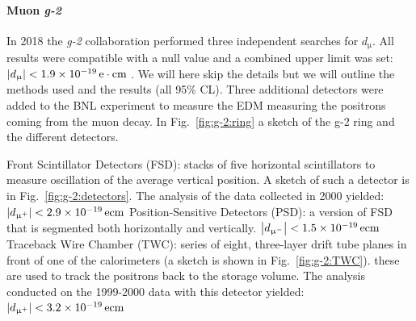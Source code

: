 \begin{refsection}
            \paragraph{Muon \textit{g-2}}
            In 2018 the \textit{g-2} collaboration performed three independent searches for $d_\upmu$.
            All results were compatible with a null value and a combined upper limit was set: $\abs{d_\upmu}<\SI{1.9e-19}{e\cdot cm}$ \cite{muEDM:direct}.  
            We will here skip the details but we will outline the methods used and the results (all 95\% CL).
            Three additional detectors were added to the BNL experiment to measure the EDM measuring the positrons coming from the muon decay.
            In Fig.~\ref{fig:g-2:ring} a sketch of the g-2 ring and the different detectors.
            \begin{outline}
                \1 Front Scintillator Detectors (FSD): stacks of five horizontal scintillators to measure oscillation of the average vertical position. A sketch of such a detector is in Fig.~\ref{fig:g-2:detectors}.
                The analysis of the data collected in 2000 yielded: $\abs{d_{\upmu^+}} < \SI{2.9e-19}{ecm}$
                \1 Position-Sensitive Detectors (PSD): a version of FSD that is segmented both horizontally and vertically.
                $\abs{d_{\upmu^-}} < \SI{1.5e-19}{ecm}$
                \1 Traceback Wire Chamber (TWC): series of eight, three-layer drift tube planes in front of one of the calorimeters (a sketch is shown in Fig.~\ref{fig:g-2:TWC}). these are used to track the positrons back to the storage volume.
                The analysis conducted on the 1999-2000 data with this detector yielded: $\abs{d_{\upmu^+}} < \SI{3.2e-19}{ecm}$
            \end{outline}


\end{refsection}
